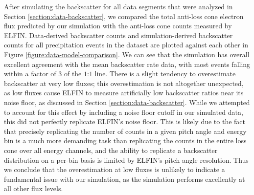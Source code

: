 \documentclass[draft]{agujournal2019}
\begin{document}
After simulating the backscatter for all data segments that were analyzed in Section \ref{section:data-backscatter}, we compared the total anti-loss cone electron flux predicted by our simulation with the anti-loss cone counts measured by ELFIN. Data-derived backscatter counts and simulation-derived backscatter counts for all precipitation events in the dataset are plotted against each other in Figure \ref{figure:data-model-comparison}. We can see that the simulation has overall excellent agreement with the mean backscatter rate data, with most events falling within a factor of $3$ of the $1$:$1$ line. There is a slight tendency to overestimate backscatter at very low fluxes; this overestimation is not altogether unexpected, as low fluxes cause ELFIN to measure artificially low backscatter ratios near its noise floor, as discussed in Section \ref{section:data-backscatter}. While we attempted to account for this effect by including a noise floor cutoff in our simulated data, this did not perfectly replicate ELFIN's noise floor. This is likely due to the fact that precisely replicating the number of counts in a given pitch angle and energy bin is a much more demanding task than replicating the counts in the entire loss cone over all energy channels, and the ability to replicate a backscatter distribution on a per-bin basis is limited by ELFIN's pitch angle resolution. Thus we conclude that the overestimation at low fluxes is unlikely to indicate a fundamental issue with our simulation, as the simulation performs excellently at all other flux levels. 
\end{document}
